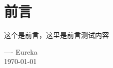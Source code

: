 \thispagestyle{empty}
\chapter*{前言}
这个是前言，这里是前言测试内容

\vspace*{3em}
\phantom{\rule{.8\linewidth+.1em}{0pt}} ---- Eureka\\ 
\phantom{\rule{.8\linewidth+.1em}{0pt}}  \today

\begin{center}
    \vfill
    \thepage
\end{center}
\let\cleardoublepage\clearpage



